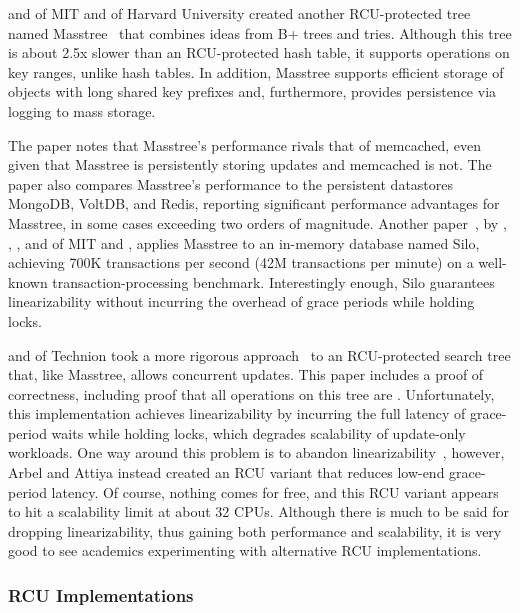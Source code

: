  and  of MIT and  of
Harvard University created another RCU-protected tree named
Masstree~\cite{Mao:2012:CCF:2168836.2168855} that combines ideas from B+
trees and tries.
Although this tree is about 2.5x slower than an RCU-protected hash table,
it supports operations on key ranges, unlike hash tables.
In addition, Masstree supports efficient storage of objects with long
shared key prefixes and, furthermore, provides persistence via logging
to mass storage.

The paper notes that Masstree's performance rivals that of memcached, even
given that Masstree is persistently storing updates and memcached is not.
The paper also compares Masstree's performance to the persistent
datastores MongoDB, VoltDB, and Redis, reporting significant performance
advantages for Masstree, in some cases exceeding two orders of magnitude.
Another paper~\cite{Tu:2013:STM:2517349.2522713}, by ,
, , and 
of MIT and ,
applies Masstree to an in-memory database named Silo, achieving 700K
transactions per second (42M transactions per minute) on a well-known
transaction-processing benchmark.
Interestingly enough, Silo guarantees linearizability without incurring
the overhead of grace periods while holding locks.

 and  of Technion took a more rigorous
approach~\cite{MayaArbel2014RCUtree} to an RCU-protected search tree that,
like Masstree, allows concurrent updates.
This paper includes a proof of correctness, including proof that all
operations on this tree are .
Unfortunately, this implementation achieves linearizability by incurring
the full latency of grace-period waits while holding locks, which degrades
scalability of update-only workloads.
One way around this problem is to abandon
linearizability~\cite{AndreasHaas2012FIFOisnt,PaulEMcKennneyAtomicTreeN4037},
however, Arbel and Attiya instead created an RCU variant that reduces
low-end grace-period latency.
Of course, nothing comes for free, and this RCU variant appears to hit
a scalability limit at about 32 CPUs.
Although there is much to be said for dropping linearizability, thus
gaining both performance and scalability, it is very good to see academics
experimenting with alternative RCU implementations.

\subsubsection{RCU Implementations}
\label{sec:defer:RCU Implementations}

